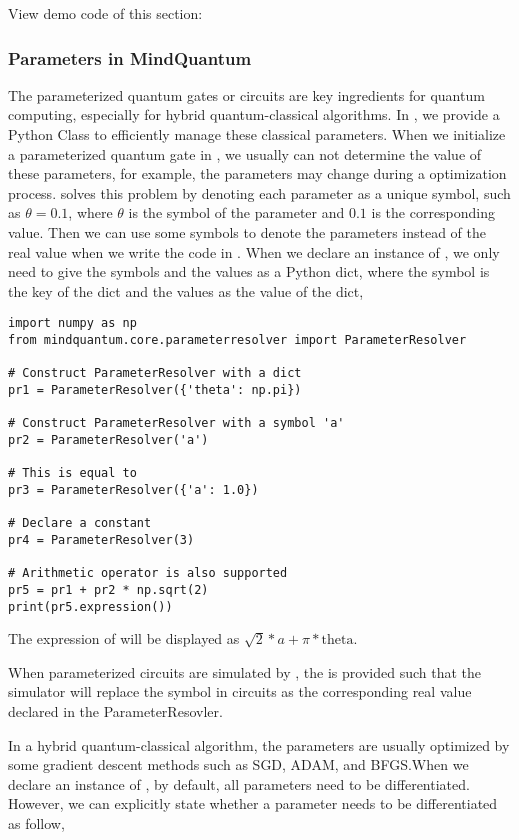 View demo code of this section: 

\subsubsection{Parameters in MindQuantum}
The parameterized quantum gates or circuits are key ingredients for quantum computing, especially for hybrid quantum-classical algorithms.
In \MindQuantum, we provide a Python Class  to efficiently manage these classical parameters.
When we initialize a parameterized quantum gate in \MindQuantum, we usually can not determine the value of these parameters, for example, the parameters may change during a optimization process.
\ParameterResolver solves this problem by
denoting each parameter as a unique symbol, such as $\theta=0.1$, where $\theta$ is the symbol of the parameter and $0.1$ is the corresponding value.
Then we can use some symbols to denote the parameters instead of the real value when we write the code in \MindQuantum.
When we declare an instance of \ParameterResolver, we only need to give the symbols and the values as a Python dict, where the symbol is the key of the dict and the values as the value of the dict,

\begin{lstlisting}
import numpy as np
from mindquantum.core.parameterresolver import ParameterResolver

# Construct ParameterResolver with a dict
pr1 = ParameterResolver({'theta': np.pi})

# Construct ParameterResolver with a symbol 'a'
pr2 = ParameterResolver('a')

# This is equal to
pr3 = ParameterResolver({'a': 1.0})

# Declare a constant
pr4 = ParameterResolver(3)

# Arithmetic operator is also supported
pr5 = pr1 + pr2 * np.sqrt(2)
print(pr5.expression())
\end{lstlisting}

The expression of  will be displayed as $\sqrt{2}*a + \pi*\text{theta}$.

When parameterized circuits are simulated by \MindQuantum, the \ParameterResolver is provided such that the simulator will replace the symbol in circuits as the corresponding real value declared in the ParameterResovler.

In a hybrid quantum-classical algorithm, the parameters are usually optimized by some gradient descent methods such as SGD, ADAM, and BFGS.When we declare an instance of \ParameterResolver, by default, all parameters need to be differentiated.
However, we can explicitly state whether a parameter needs to be differentiated as follow,

